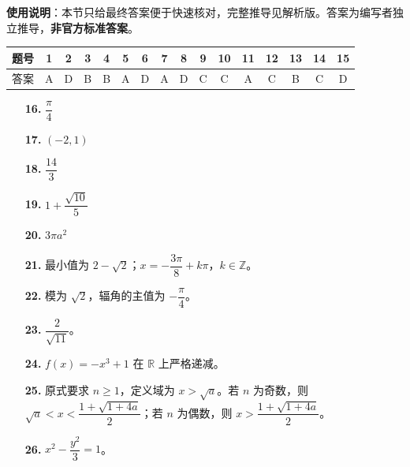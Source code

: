 
\begin{gknotice}
\textbf{使用说明}：本节只给最终答案便于快速核对，完整推导见解析版。答案为编写者独立推导，\textbf{非官方标准答案}。
\end{gknotice}

\begin{center}\begin{tabular}{cccccccccccccccc}
\toprule
题号 & 1 & 2 & 3 & 4 & 5 & 6 & 7 & 8 & 9 & 10 & 11 & 12 & 13 & 14 & 15 \\
\midrule
答案 & A & D & B & B & A & D & A & D & C & C & A & C & B & C & D \\
\bottomrule
\end{tabular}\end{center}

\begin{itemize}[leftmargin=2.6em]
  \item[\textbf{16.}] $\dfrac\pi4$
  \item[\textbf{17.}] $(-2,1)$
  \item[\textbf{18.}] $\dfrac{14}3$
  \item[\textbf{19.}] $1+\dfrac{\sqrt{10}}5$
  \item[\textbf{20.}] $3\pi a^2$
\end{itemize}

\begin{itemize}[leftmargin=2.6em]
  \item[\textbf{21.}] 最小值为 $2-\sqrt2$；$x=-\dfrac{3\pi}8+k\pi$，$k\in\mathbb Z$。
  \item[\textbf{22.}] 模为 $\sqrt2$，辐角的主值为 $-\dfrac\pi4$。
  \item[\textbf{23.}] $\dfrac2{\sqrt{11}}$。
  \item[\textbf{24.}] $f(x)=-x^3+1$ 在 $\mathbb R$ 上严格递减。
  \item[\textbf{25.}] 原式要求 $n\ge1$，定义域为 $x>\sqrt a$。若 $n$ 为奇数，则 $\sqrt a<x<\dfrac{1+\sqrt{1+4a}}2$；若 $n$ 为偶数，则 $x>\dfrac{1+\sqrt{1+4a}}2$。
  \item[\textbf{26.}] $x^2-\dfrac{y^2}3=1$。
\end{itemize}
